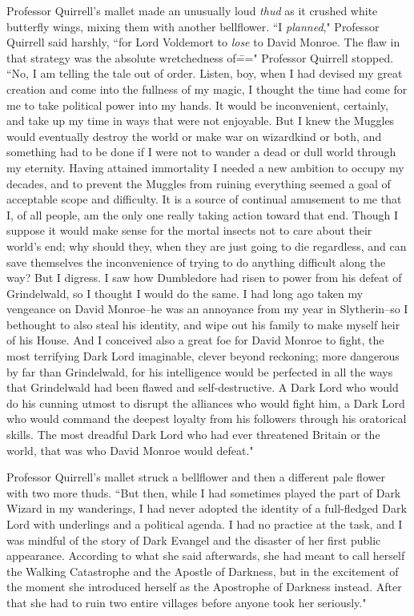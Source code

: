 Professor Quirrell's mallet made an unusually loud \emph{thud} as it crushed white butterfly wings, mixing them with another bellflower. ``I \emph{planned}," Professor Quirrell said harshly, ``for Lord Voldemort to \emph{lose} to David Monroe. The flaw in that strategy was the absolute wretchedness of\===" Professor Quirrell stopped. ``No, I am telling the tale out of order. Listen, boy, when I had devised my great creation and come into the fullness of my magic, I thought the time had come for me to take political power into my hands. It would be inconvenient, certainly, and take up my time in ways that were not enjoyable. But I knew the Muggles would eventually destroy the world or make war on wizardkind or both, and something had to be done if I were not to wander a dead or dull world through my eternity. Having attained immortality I needed a new ambition to occupy my decades, and to prevent the Muggles from ruining everything seemed a goal of acceptable scope and difficulty. It is a source of continual amusement to me that I, of all people, am the only one really taking action toward that end. Though I suppose it would make sense for the mortal insects not to care about their world's end; why should they, when they are just going to die regardless, and can save themselves the inconvenience of trying to do anything difficult along the way? But I digress. I saw how Dumbledore had risen to power from his defeat of Grindelwald, so I thought I would do the same. I had long ago taken my vengeance on David Monroe\---he was an annoyance from my year in Slytherin\---so I bethought to also steal his identity, and wipe out his family to make myself heir of his House. And I conceived also a great foe for David Monroe to fight, the most terrifying Dark Lord imaginable, clever beyond reckoning; more dangerous by far than Grindelwald, for his intelligence would be perfected in all the ways that Grindelwald had been flawed and self-destructive. A Dark Lord who would do his cunning utmost to disrupt the alliances who would fight him, a Dark Lord who would command the deepest loyalty from his followers through his oratorical skills. The most dreadful Dark Lord who had ever threatened Britain or the world, that was who David Monroe would defeat."

Professor Quirrell's mallet struck a bellflower and then a different pale flower with two more thuds. ``But then, while I had sometimes played the part of Dark Wizard in my wanderings, I had never adopted the identity of a full-fledged Dark Lord with underlings and a political agenda. I had no practice at the task, and I was mindful of the story of Dark Evangel and the disaster of her first public appearance. According to what she said afterwards, she had meant to call herself the Walking Catastrophe and the Apostle of Darkness, but in the excitement of the moment she introduced herself as the Apostrophe of Darkness instead. After that she had to ruin two entire villages before anyone took her seriously."

